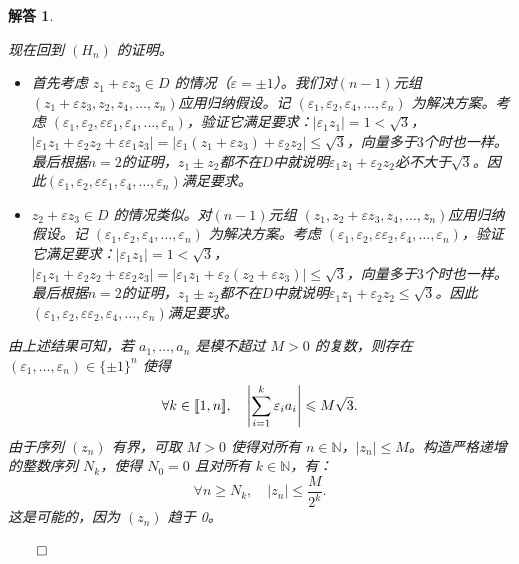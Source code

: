 \documentclass[12pt,UTF8,fontset=none]{ctexbook}
\theoremstyle{exercisestyle}
\theoremstyle{solutionstyle}
\newtheorem*{solution*}{解答}
\newenvironment{solution}
  {\begin{solution*}}
  {\hfill\ensuremath{\qed}\end{solution*}}
\begin{document}
\begin{solution}
\begin{subquestions}
\begin{enumerate}[label=\arabic*.]
现在回到 \( (H_n) \) 的证明。
\begin{itemize}
  \item 首先考虑 \( z_1 +\varepsilon z_3 \in D \) 的情况（$\varepsilon = \pm 1$）。我们对\( (n-1) \)元组 \( (z_1 + \varepsilon z_3, z_2, z_4, \ldots, z_n) \)应用归纳假设。记 \( (\varepsilon_1, \varepsilon_2, \varepsilon_4, \ldots, \varepsilon_n) \) 为解决方案。考虑 \( (\varepsilon_1, \varepsilon_2, \varepsilon \varepsilon_1, \varepsilon_4, \ldots, \varepsilon_n) \)，验证它满足要求：\( |\varepsilon_1 z_1| = 1 < \sqrt{3} \)，\( |\varepsilon_1 z_1 + \varepsilon_2 z_2 + \varepsilon \varepsilon_1 z_3| = |\varepsilon_1 (z_1 + \varepsilon z_3) + \varepsilon_2 z_2| \leqslant \sqrt{3} \)，向量多于$3$个时也一样。最后根据$n=2$的证明，\( z_1 \pm z_2 \)都不在$D$中就说明\( \varepsilon_1 z_1 + \varepsilon_2 z_2 \)必不大于$\sqrt{3}$。因此\( (\varepsilon_1, \varepsilon_2, \varepsilon \varepsilon_1, \varepsilon_4, \ldots, \varepsilon_n) \)满足要求。
  \item \( z_2 +\varepsilon z_3 \in D \) 的情况类似。对\( (n-1) \)元组 \( (z_1,z_2 + \varepsilon  z_3, z_4, \ldots, z_n) \)应用归纳假设。记 \( (\varepsilon_1, \varepsilon_2, \varepsilon_4, \ldots, \varepsilon_n) \) 为解决方案。考虑 \( (\varepsilon_1, \varepsilon_2, \varepsilon \varepsilon_2, \varepsilon_4, \ldots, \varepsilon_n) \)，验证它满足要求：\( |\varepsilon_1 z_1| = 1 < \sqrt{3} \)，\( |\varepsilon_1 z_1 + \varepsilon_2 z_2 + \varepsilon \varepsilon_2 z_3| = |\varepsilon_1 z_1 + \varepsilon_2 (z_2 + \varepsilon z_3)| \leqslant \sqrt{3} \)，向量多于$3$个时也一样。最后根据$n=2$的证明，\( z_1 \pm z_2 \)都不在$D$中就说明$ \varepsilon_1 z_1 + \varepsilon_2 z_2 \leqslant\sqrt{3}$。因此\( (\varepsilon_1, \varepsilon_2, \varepsilon \varepsilon_2, \varepsilon_4, \ldots, \varepsilon_n) \)满足要求。
\end{itemize}
\end{enumerate}

\item 由上述结果可知，若 \( a_1, \ldots, a_n \) 是模不超过 \( M > 0 \) 的复数，则存在 \( (\varepsilon_1, \ldots, \varepsilon_n) \in \{\pm 1\}^n \) 使得
\[
\forall k \in [\![1,n]\!], \quad \left| \sum_{i=1}^k \varepsilon_i a_i \right| \leqslant M\sqrt{3}.
\]
由于序列 \( (z_n) \) 有界，可取 \( M > 0 \) 使得对所有 \( n \in \mathbb{N} \)，\( |z_n| \leqslant M \)。构造严格递增的整数序列 \( N_k \)，使得 \( N_0 = 0 \) 且对所有 \( k \in \mathbb{N} \)，有：
\[
\forall n \geq N_k, \quad |z_n| \leqslant \frac{M}{2^k}.
\]
这是可能的，因为 \( (z_n) \) 趋于 0。


\end{subquestions}
\end{solution}
\end{document}
